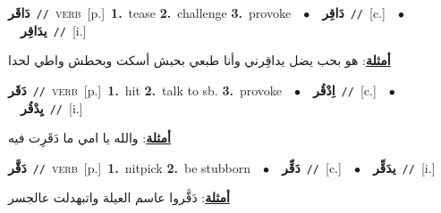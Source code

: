 \documentclass[10pt,a4paper,twoside]{article} %
\begin{document}
\begin{multicols}{2}
{\setlength\topsep{0pt}\textbf{\foreignlanguage{arabic}{دَاقَر}}\ {\color{gray}\texttt{//}\color{black}}\ \textsc{verb}\ [p.]\ \textbf{1.}~tease  \textbf{2.}~challenge  \textbf{3.}~provoke\ \ $\bullet$\ \ \setlength\topsep{0pt}\textbf{\foreignlanguage{arabic}{دَاقِر}}\ {\color{gray}\texttt{//}\color{black}}\ [c.]\ \ $\bullet$\ \ \setlength\topsep{0pt}\textbf{\foreignlanguage{arabic}{يدَاقِر}}\ {\color{gray}\texttt{//}\color{black}}\ [i.]\  \begin{flushright}\color{gray}\foreignlanguage{arabic}{\textbf{\underline{\foreignlanguage{arabic}{أمثلة}}}: هو بحب يضل يداقِرني وأنا طبعي بحبش أسكت وبحطش واطي لحدا}\end{flushright}\color{black}} \vspace{2mm}

{\setlength\topsep{0pt}\textbf{\foreignlanguage{arabic}{دَقَر}}\ {\color{gray}\texttt{//}\color{black}}\ \textsc{verb}\ [p.]\ \textbf{1.}~hit  \textbf{2.}~talk to sb.  \textbf{3.}~provoke\ \ $\bullet$\ \ \setlength\topsep{0pt}\textbf{\foreignlanguage{arabic}{اِدْقُر}}\ {\color{gray}\texttt{//}\color{black}}\ [c.]\ \ $\bullet$\ \ \setlength\topsep{0pt}\textbf{\foreignlanguage{arabic}{يِدْقُر}}\ {\color{gray}\texttt{//}\color{black}}\ [i.]\  \begin{flushright}\color{gray}\foreignlanguage{arabic}{\textbf{\underline{\foreignlanguage{arabic}{أمثلة}}}: والله يا امي ما دَقَرِت فيه}\end{flushright}\color{black}} \vspace{2mm}

{\setlength\topsep{0pt}\textbf{\foreignlanguage{arabic}{دَقَّر}}\ {\color{gray}\texttt{//}\color{black}}\ \textsc{verb}\ [p.]\ \textbf{1.}~nitpick  \textbf{2.}~be stubborn\ \ $\bullet$\ \ \setlength\topsep{0pt}\textbf{\foreignlanguage{arabic}{دَقِّر}}\ {\color{gray}\texttt{//}\color{black}}\ [c.]\ \ $\bullet$\ \ \setlength\topsep{0pt}\textbf{\foreignlanguage{arabic}{يدَقِّر}}\ {\color{gray}\texttt{//}\color{black}}\ [i.]\  \begin{flushright}\color{gray}\foreignlanguage{arabic}{\textbf{\underline{\foreignlanguage{arabic}{أمثلة}}}: دَقَّروا عاسم العيلة واتبهدلت عالجسر}\end{flushright}\color{black}} \vspace{2mm}


\end{multicols}
\end{document}
